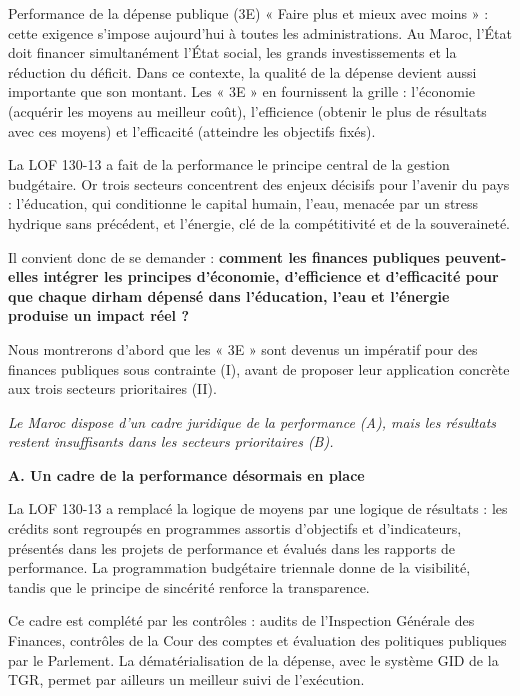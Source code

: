 \begin{copiemodele}{Performance de la dépense publique (3E)}
« Faire plus et mieux avec moins » : cette exigence s'impose aujourd'hui à toutes les administrations. Au Maroc, l'État doit financer simultanément l'État social, les grands investissements et la réduction du déficit. Dans ce contexte, la qualité de la dépense devient aussi importante que son montant. Les « 3E » en fournissent la grille : l'économie (acquérir les moyens au meilleur coût), l'efficience (obtenir le plus de résultats avec ces moyens) et l'efficacité (atteindre les objectifs fixés).

La LOF 130-13 a fait de la performance le principe central de la gestion budgétaire. Or trois secteurs concentrent des enjeux décisifs pour l'avenir du pays : l'éducation, qui conditionne le capital humain, l'eau, menacée par un stress hydrique sans précédent, et l'énergie, clé de la compétitivité et de la souveraineté.

Il convient donc de se demander : \textbf{comment les finances publiques peuvent-elles intégrer les principes d'économie, d'efficience et d'efficacité pour que chaque dirham dépensé dans l'éducation, l'eau et l'énergie produise un impact réel ?}

Nous montrerons d'abord que les « 3E » sont devenus un impératif pour des finances publiques sous contrainte (I), avant de proposer leur application concrète aux trois secteurs prioritaires (II).

\textit{Le Maroc dispose d'un cadre juridique de la performance (A), mais les résultats restent insuffisants dans les secteurs prioritaires (B).}

\textbf{A. Un cadre de la performance désormais en place}

La LOF 130-13 a remplacé la logique de moyens par une logique de résultats : les crédits sont regroupés en programmes assortis d'objectifs et d'indicateurs, présentés dans les projets de performance et évalués dans les rapports de performance. La programmation budgétaire triennale donne de la visibilité, tandis que le principe de sincérité renforce la transparence.

Ce cadre est complété par les contrôles : audits de l'Inspection Générale des Finances, contrôles de la Cour des comptes et évaluation des politiques publiques par le Parlement. La dématérialisation de la dépense, avec le système GID de la TGR, permet par ailleurs un meilleur suivi de l'exécution.


\end{copiemodele}
